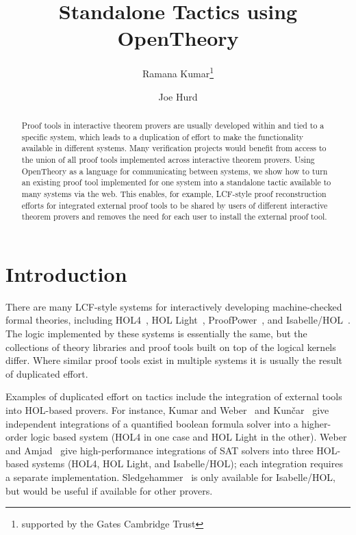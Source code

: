 \documentclass{llncs}
\newcommand{\OpenTheory}{OpenTheory\xspace}
\begin{document}
\title{Standalone Tactics using OpenTheory}

\author{Ramana Kumar\thanks{supported by the Gates Cambridge Trust}\and Joe Hurd}


\maketitle

\begin{abstract}
Proof tools in interactive theorem provers are usually developed within and tied to a specific system, which leads to a duplication of effort to make the functionality available in different systems.
Many verification projects would benefit from access to the union of all proof tools implemented across interactive theorem provers.
Using \OpenTheory as a language for communicating between systems, we show how to turn an existing proof tool implemented for one system into a standalone tactic available to many systems via the web.
This enables, for example, LCF-style proof reconstruction efforts for integrated external proof tools to be shared by users of different interactive theorem provers and removes the need for each user to install the external proof tool.
\end{abstract}

\section{Introduction}

There are many LCF-style systems for interactively developing machine-checked formal theories, including HOL4~\cite{slind08brief}, HOL Light~\cite{DBLP:conf/tphol/Harrison09a}, ProofPower~\cite{ProofPower}, and Isabelle/HOL~\cite{wenzel08isabelle}.
The logic implemented by these systems is essentially the same, but the collections of theory libraries and proof tools built on top of the logical kernels differ.
Where similar proof tools exist in multiple systems it is usually the result of duplicated effort.

Examples of duplicated effort on tactics include the integration of external tools into HOL-based provers.
For instance, Kumar and Weber~\cite{DBLP:conf/itp/KumarW11} and Kun\v{c}ar~\cite{DBLP:conf/itp/Kuncar11} give independent integrations of a quantified boolean formula solver into a higher-order logic based system (HOL4 in one case and HOL Light in the other).
Weber and Amjad~\cite{weber09efficiently} give high-performance integrations of SAT solvers into three HOL-based systems (HOL4, HOL Light, and Isabelle/HOL); each integration requires a separate implementation.
Sledgehammer~\cite{DBLP:conf/frocos/BlanchetteBN11} is only available for Isabelle/HOL, but would be useful if available for other provers.
\end{document}

